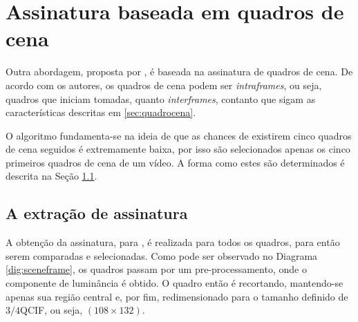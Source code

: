\section{Assinatura baseada em quadros de cena}

	Outra abordagem, proposta por \citeauthor{mao2015sceneframe}, é baseada na assinatura de quadros de cena. De acordo com os autores, os quadros de cena podem ser \textit{intraframes}, ou seja, quadros que iniciam tomadas, quanto \textit{interframes}, contanto que sigam as características descritas em \ref{sec:quadrocena}.
    
    O algoritmo fundamenta-se na ideia de que as chances de existirem cinco quadros de cena seguidos é extremamente baixa, por isso são selecionados apenas os cinco primeiros quadros de cena de um vídeo. A forma como estes são determinados é descrita na Seção \ref{subsec:fptsceneframe}.

\subsection{A extração de assinatura}
\label{subsec:fptsceneframe}

% 

A obtenção da assinatura, para \citeauthor{mao2015sceneframe}, é realizada para todos os quadros, para então serem comparadas e selecionadas. Como pode ser observado no Diagrama \ref{dig:sceneframe}, os quadros passam por um pre-processamento, onde o componente de luminância é obtido. O quadro então é recortando, mantendo-se apenas sua região central e, por fim, redimensionado para o tamanho definido de $3/4$QCIF, ou seja, $(108\times132)$.


